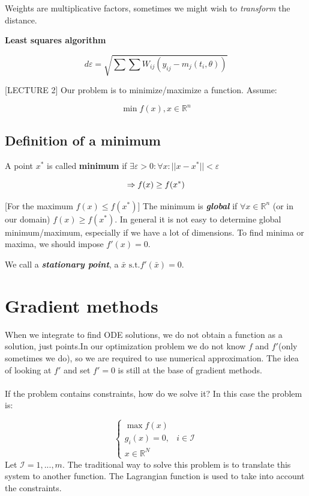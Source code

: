 \noindent
Weights are multiplicative factors, sometimes we might wish to
\emph{transform} the distance.

\textbf{Least squares algorithm}

$$d{\varepsilon}=\sqrt{\sum \sum W_{ij}\left(y_{ij}-m_j\left(t_i, \theta\right)\right)}$$

[LECTURE 2]
\noindent
Our problem is to minimize/maximize a function. Assume:

$$
\min f(x), x \in \mathbb{R}^n
$$

\subsection{Definition of a minimum}

A point $x^*$ is called \textbf{minimum} if
$\exists \varepsilon > 0 : \forall x : || x- x^* || < \varepsilon$

$$
\Rightarrow f(x) \geq f(x^*) \\ 
$$

{[}For the maximum $f(x) \leq f(x^*)${]}
\noindent
The minimum is \textbf{\emph{global}} if $\forall x \in \mathbb{R}^n$
(or in our domain) $f(x) \geq f(x^*)$. In general it is not easy to
determine global minimum/maximum, especially if we have a lot of
dimensions.
\noindent
To find minima or maxima, we should impose $f'(x)=0$.

We call a \textbf{\emph{stationary point}}, a
$\bar{x} \text{ s.t.} f'(\bar{x})=0$.

\hypertarget{gradient-methods}{%
\section{Gradient methods}\label{gradient-methods}}

When we integrate to find ODE solutions, we do not obtain a function as
a solution, just points.In our optimization problem we do not know $f$ and $f'$(only sometimes
we do), so we are required to use numerical approximation. The idea of
looking at $f'$ and set $f'=0$ is still at the base of gradient methods.
\\
\\
\noindent
If the problem contains constraints, how do we solve it? In this case
the problem is:

$$\left\{\begin{array}{ll}
\max f(x) &  \\
g_i(x)=0, & i \in \mathcal{I} \\
x \in \mathbb{R}^N
\end{array}\right.$$
\noindent
Let $\mathcal{I}= 1,...,m$. The traditional way to solve this problem is
to translate this system to another function. The Lagrangian function is
used to take into account the constraints.

